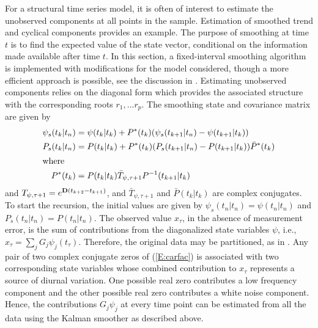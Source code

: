 For a structural time series model, it is often of interest to estimate the unobserved components at all points in the sample. Estimation of smoothed trend and cyclical components provides an example. %
The purpose of smoothing at time $t$ is to find the expected value of the state vector, conditional on the information made available after time $t$.
 In this section, a fixed-interval smoothing algorithm \citep[\S3.6.2]{Harv:1990} is implemented with modifications for the model considered, though a more efficient approach is possible, see the discussion in \citet[\S4.3]{Durb:Koop:2001}. Estimating unobserved components relies on the diagonal form which provides the associated structure with the corresponding roots $r_1, ... r_p$. 
The smoothing state and covariance matrix are given by
\begin{align}\label{equ:smoscm} 
\psi_s(t_k|t_n)&=\psi(t_k|t_k)+P^*(t_k)(\psi_s(t_{k+1}|t_n)%
-\psi(t_{k+1}|t_k))\\
P_s(t_k|t_n)&=P(t_k|t_k)+P^*(t_k)(P_s(t_{k+1}|t_n)%
-P(t_{k+1}|t_k))\bar{P}^*(t_k)\\
\intertext{where} 
P^*(t_k)&=P(t_k|t_k)\bar{T}_{\psi,\tau+1}P^{-1}(t_{k+1}|t_k)
\end{align}
and ${T}_{\psi,\tau+1}=e^{\bold{D}(t_{k+2}-t_{k+1})}$, and $\bar{T}_{\psi,\tau+1}$ and $\bar{P}(t_k|t_k)$ are complex conjugates. To start the recursion, the initial values are given by $\psi_s(t_n|t_n)=\psi(t_n|t_n)$ and $P_s(t_n|t_n)=P(t_n|t_n)$. The observed value $x_{\tau}$, in the absence of measurement error, is the sum of contributions from the diagonalized state variables $\psi$, i.e., $x_{\tau}=\sum_jG_j\psi_j(t_{\tau})$. Therefore, the original data may be partitioned, as in \citet[\S7.3.5]{Jenk:Watt:1968}. Any pair of two complex conjugate zeros of (\ref{E:carfac}) is associated with two corresponding state variables whose combined contribution to $x_{\tau}$ represents a source of diurnal variation. One possible real zero contributes a low frequency component and the other possible real zero contributes a white noise component. Hence, the contributions $G_j\psi_j$ at every time point can be estimated from all the data using the Kalman smoother as described above.



